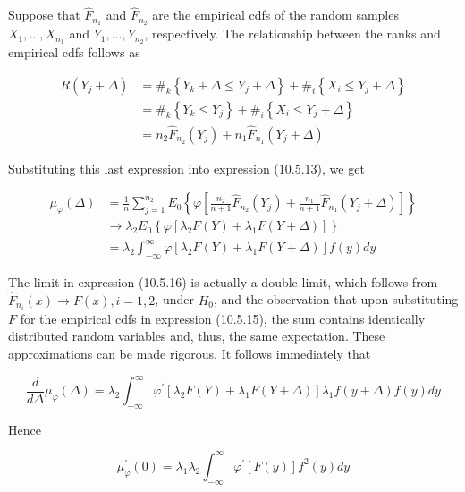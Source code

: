 Suppose that $\widehat{F}_{n_{1}}$ and $\widehat{F}_{n_{2}}$ are the empirical cdfs of the random samples $X_{1}, \ldots, X_{n_{1}}$ and $Y_{1}, \ldots, Y_{n_{2}}$, respectively. The relationship between the ranks and empirical cdfs follows as


\begin{align*}
R\left(Y_{j}+\Delta\right) & =\#_{k}\left\{Y_{k}+\Delta \leq Y_{j}+\Delta\right\}+\#_{i}\left\{X_{i} \leq Y_{j}+\Delta\right\} \\
& =\#_{k}\left\{Y_{k} \leq Y_{j}\right\}+\#_{i}\left\{X_{i} \leq Y_{j}+\Delta\right\} \\
& =n_{2} \widehat{F}_{n_{2}}\left(Y_{j}\right)+n_{1} \widehat{F}_{n_{1}}\left(Y_{j}+\Delta\right) \tag{10.5.14}
\end{align*}


Substituting this last expression into expression (10.5.13), we get


\begin{align*}
\mu_{\varphi}(\Delta) & =\frac{1}{n} \sum_{j=1}^{n_{2}} E_{0}\left\{\varphi\left[\frac{n_{2}}{n+1} \widehat{F}_{n_{2}}\left(Y_{j}\right)+\frac{n_{1}}{n+1} \widehat{F}_{n_{1}}\left(Y_{j}+\Delta\right)\right]\right\}  \tag{10.5.15}\\
& \rightarrow \lambda_{2} E_{0}\left\{\varphi\left[\lambda_{2} F(Y)+\lambda_{1} F(Y+\Delta)\right]\right\}  \tag{10.5.16}\\
& =\lambda_{2} \int_{-\infty}^{\infty} \varphi\left[\lambda_{2} F(Y)+\lambda_{1} F(Y+\Delta)\right] f(y) d y \tag{10.5.17}
\end{align*}


The limit in expression (10.5.16) is actually a double limit, which follows from $\widehat{F}_{n_{i}}(x) \rightarrow F(x), i=1,2$, under $H_{0}$, and the observation that upon substituting $F$ for the empirical cdfs in expression (10.5.15), the sum contains identically distributed random variables and, thus, the same expectation. These approximations can be made rigorous. It follows immediately that

$$
\frac{d}{d \Delta} \mu_{\varphi}(\Delta)=\lambda_{2} \int_{-\infty}^{\infty} \varphi^{\prime}\left[\lambda_{2} F(Y)+\lambda_{1} F(Y+\Delta)\right] \lambda_{1} f(y+\Delta) f(y) d y
$$

Hence


\begin{equation*}
\mu_{\varphi}^{\prime}(0)=\lambda_{1} \lambda_{2} \int_{-\infty}^{\infty} \varphi^{\prime}[F(y)] f^{2}(y) d y \tag{10.5.18}
\end{equation*}



